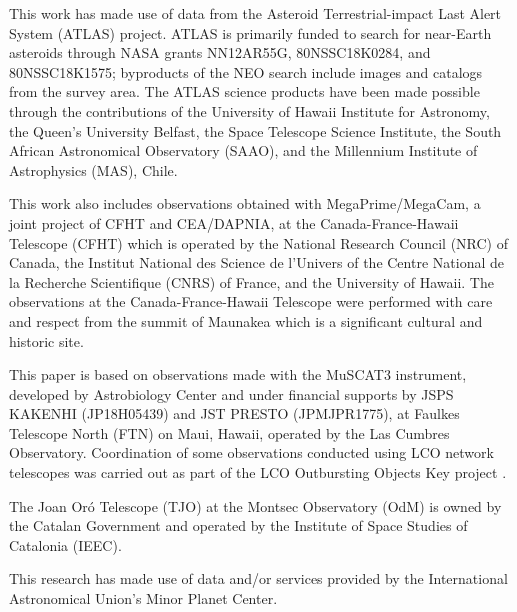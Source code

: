 \documentclass[linenumbers,twocolumn,longbib]{aastex7}
\begin{document}
\begin{acknowledgments}
This work has made use of data from the Asteroid Terrestrial-impact Last Alert System (ATLAS) project. ATLAS is primarily funded to search for near-Earth asteroids through NASA grants NN12AR55G, 80NSSC18K0284, and 80NSSC18K1575; byproducts of the NEO search include images and catalogs from the survey area.  The ATLAS science products have been  made possible through the contributions of the University of Hawaii Institute for Astronomy, the Queen's University Belfast, the Space Telescope Science Institute, the South African Astronomical Observatory (SAAO), and the Millennium Institute of Astrophysics (MAS), Chile.

This work also includes observations obtained with MegaPrime/MegaCam, a joint project of CFHT and CEA/DAPNIA, at the Canada-France-Hawaii Telescope (CFHT) which is operated by the National Research Council (NRC) of Canada, the Institut National des Science de l'Univers of the Centre National de la Recherche Scientifique (CNRS) of France, and the University of Hawaii. The observations at the Canada-France-Hawaii Telescope were performed with care and respect from the summit of Maunakea which is a significant cultural and historic site.

This paper is based on observations made with the MuSCAT3 instrument, developed by Astrobiology Center and under financial supports by JSPS KAKENHI (JP18H05439) and JST PRESTO (JPMJPR1775), at Faulkes Telescope North (FTN) on Maui, Hawaii, operated by the Las Cumbres Observatory.  Coordination of some observations conducted using LCO network telescopes was carried out as part of the LCO Outbursting Objects Key project \citep[LOOK;][]{lister2022_look}.

The Joan Or\'{o} Telescope (TJO) at the Montsec Observatory (OdM) is owned by the Catalan Government and operated by the Institute of Space Studies of Catalonia (IEEC).

This research has made use of data and/or services provided by the International Astronomical Union's Minor Planet Center.

\end{acknowledgments}
\end{document}
